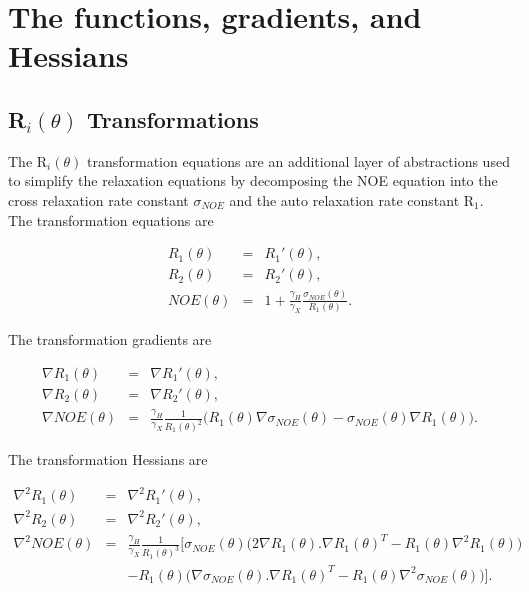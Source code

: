 
\chapter{The functions, gradients, and Hessians}




\section{R$_i(\theta)$ Transformations}

The R$_i(\theta)$ transformation equations are an additional layer of abstractions used to simplify the relaxation equations by decomposing the NOE equation into the cross relaxation rate constant $\sigma_{NOE}$ and the auto relaxation rate constant R$_1$.  The transformation equations are

\begin{eqnarray}
    R_1(\theta) & = & R_1'(\theta), \label{eq: Ri trans: R1} \\
    R_2(\theta) & = & R_2'(\theta), \label{eq: Ri trans: R2} \\
    NOE(\theta) & = & 1 + \frac{\gamma_H}{\gamma_X} \frac{\sigma_{NOE}(\theta)}{R_1(\theta)}. \label{eq: Ri trans: NOE}
\end{eqnarray}

\noindent The transformation gradients are

\begin{eqnarray}
    \nabla R_1(\theta) & = & \nabla R_1'(\theta), \label{eq: Ri trans: dR1} \\
    \nabla R_2(\theta) & = & \nabla R_2'(\theta), \label{eq: Ri trans: dR2} \\
    \nabla NOE(\theta) & = & \frac{\gamma_H}{\gamma_X} \frac{1}{R_1(\theta)^2} \Big(
        R_1(\theta) \nabla \sigma_{NOE}(\theta) - \sigma_{NOE}(\theta) \nabla R_1(\theta)
    \Big). \label{eq: Ri trans: dNOE}
\end{eqnarray}

\noindent The transformation Hessians are

\begin{eqnarray}
    \nabla^2 R_1(\theta) & = & \nabla^2 R_1'(\theta), \label{eq: Ri trans: d2R1} \\
    \nabla^2 R_2(\theta) & = & \nabla^2 R_2'(\theta), \label{eq: Ri trans: d2R2} \\
    \nabla^2 NOE(\theta) & = & \frac{\gamma_H}{\gamma_X} \frac{1}{R_1(\theta)^3} \bigg[
        \sigma_{NOE}(\theta) \Big( 2 \nabla R_1(\theta) . \nabla R_1(\theta)^T - R_1(\theta) \nabla^2 R_1(\theta) \Big) \nonumber\\
        & & - R_1(\theta) \Big( \nabla \sigma_{NOE}(\theta) . \nabla R_1(\theta)^T - R_1(\theta) \nabla^2 \sigma_{NOE}(\theta) \Big)
    \bigg]. \label{eq: Ri trans: d2NOE}
\end{eqnarray}



